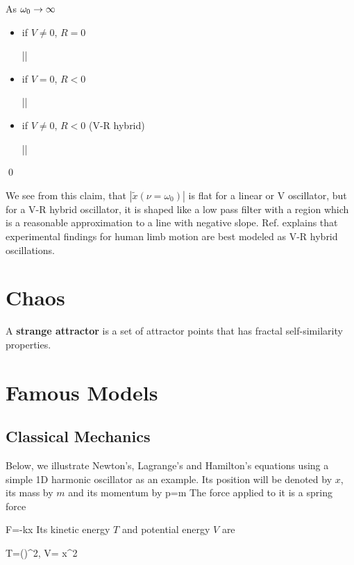 As $\omega_0\rightarrow
\infty$
 
\begin{itemize}
\item if $V\neq 0$, $R=0$

\beq
||\propto {}
\eeq

\item if $V= 0$, $R< 0$

\beq
||\propto {}
\eeq

\item if $V\neq 0$, $R< 0$ (V-R hybrid)

\beq
||\propto {}
\eeq
\end{itemize}
\qed

We see from
this claim,
that $|\tilde{x}(\nu=\omega_0)|$
is flat for a linear or V oscillator,
but for a V-R hybrid oscillator, 
 it is shaped like a low pass filter with a region which is a reasonable approximation to a  line
 with negative slope.
 Ref.\cite{dynamical-fuchs} explains 
 that experimental findings for human limb motion
 are best modeled as V-R hybrid oscillations.
 



\section{Chaos}

A {\bf strange attractor}
is a set of attractor points that has fractal self-similarity 
properties.

\section{Famous Models}

\OtoAd

\subsection{Classical Mechanics}

Below, we illustrate Newton's, Lagrange's and
Hamilton's equations using a simple 1D harmonic
oscillator as an example. 
Its position 
will be denoted by $x$, its mass by $m$ and its momentum by
\beq
p=m
\eeq
The force applied to it is a spring force

\beq
F=-kx
\eeq
Its kinetic energy $T$
and potential energy $V$
are

\beq
T=()^2\;, \;\;
V= x^2
\eeq



